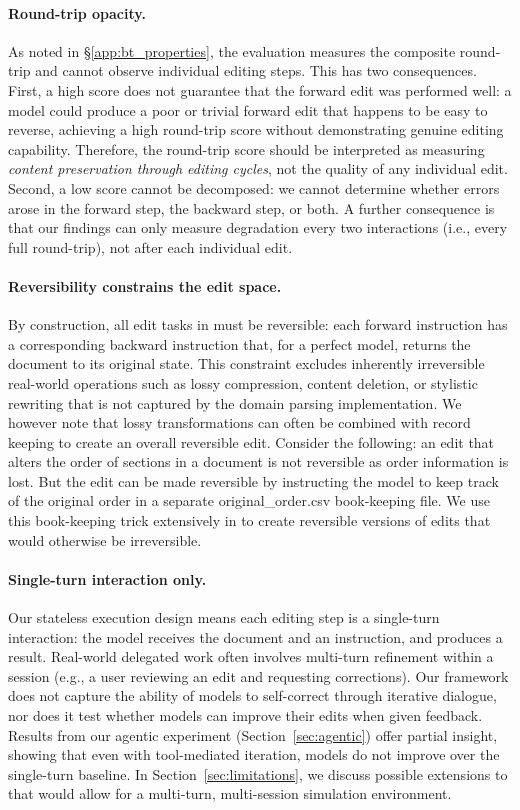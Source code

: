 \documentclass{article} %
\begin{document}
\paragraph{Round-trip opacity.} As noted in \S\ref{app:bt_properties}, the evaluation measures the composite round-trip and cannot observe individual editing steps. This has two consequences. First, a high score does not guarantee that the forward edit was performed well: a model could produce a poor or trivial forward edit that happens to be easy to reverse, achieving a high round-trip score without demonstrating genuine editing capability. Therefore, the round-trip score should be interpreted as measuring \textit{content preservation through editing cycles}, not the quality of any individual edit. Second, a low score cannot be decomposed: we cannot determine whether errors arose in the forward step, the backward step, or both. A further consequence is that our findings can only measure degradation every two interactions (i.e., every full round-trip), not after each individual edit.

\paragraph{Reversibility constrains the edit space.} By construction, all edit tasks in \benchmark{} must be reversible: each forward instruction has a corresponding backward instruction that, for a perfect model, returns the document to its original state. This constraint excludes inherently irreversible real-world operations such as lossy compression, content deletion, or stylistic rewriting that is not captured by the domain parsing implementation. We however note that lossy transformations can often be combined with record keeping to create an overall reversible edit. Consider the following: an edit that alters the order of sections in a document is not reversible as order information is lost. But the edit can be made reversible by instructing the model to keep track of the original order in a separate original\_order.csv book-keeping file. We use this book-keeping trick extensively in \benchmark{} to create reversible versions of edits that would otherwise be irreversible.

\paragraph{Single-turn interaction only.} Our stateless execution design means each editing step is a single-turn interaction: the model receives the document and an instruction, and produces a result. Real-world delegated work often involves multi-turn refinement within a session (e.g., a user reviewing an edit and requesting corrections). Our framework does not capture the ability of models to self-correct through iterative dialogue, nor does it test whether models can improve their edits when given feedback. Results from our agentic experiment (Section~\ref{sec:agentic}) offer partial insight, showing that even with tool-mediated iteration, models do not improve over the single-turn baseline. In Section~\ref{sec:limitations}, we discuss possible extensions to \benchmark{} that would allow for a multi-turn, multi-session simulation environment.
\end{document}
